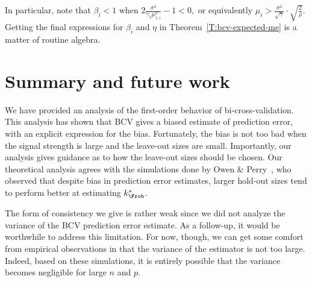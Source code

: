In particular, note that $\beta_i < 1$ when
\(
    2 \frac{\sigma^4}{\gamma_1 \mu_{1,i}^2} - 1 < 0,
\)
or equivalently
\(
    \mu_i > \frac{\sigma^2}{\sqrt{\gamma}} \cdot \sqrt{\frac{2}{\rho}}.
\)
Getting the final expressions for $\beta_i$ and $\eta$ in 
Theorem~\ref{T:bcv-expected-me} is a matter of routine algebra.

\section{Summary and future work}\label{S:bcv-theory-summary}

We have provided an analysis of the first-order behavior of bi-cross-validation.  This analysis has shown that BCV gives a biased estimate of prediction error, with an explicit expression for the bias.  Fortunately, the bias is not too bad when the signal strength is large and the leave-out sizes are small.  Importantly, our analysis gives guidance as to how the leave-out sizes should be chosen.  Our theoretical analysis agrees with the simulations done by Owen \& Perry~\cite{owen2009bi}, who observed that despite bias in prediction error estimates, larger hold-out sizes tend to perform better at estimating $k_\Frob^\ast$.

The form of consistency we give is rather weak since we did not analyze the variance of the BCV prediction error estimate.  As a follow-up, it would be worthwhile to address this limitation.  For now, though, we can get some comfort from empirical observations in \cite{owen2009bi} that the variance of the estimator is not too large.  Indeed, based on these simulations, it is entirely possible that the variance becomes negligible for large $n$ and $p$.
